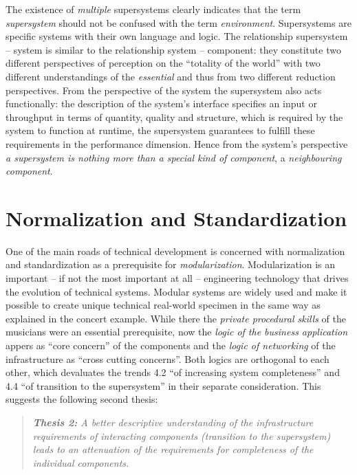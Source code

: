 \documentclass{llncs}
\begin{document}
The existence of \emph{multiple} supersystems clearly indicates that the term
\emph{supersystem} should not be confused with the term \emph{environment}.
Supersystems are specific systems with their own language and logic. The
relationship supersystem -- system is similar to the relationship system --
component: they constitute two different perspectives of perception on the
``totality of the world'' with two different understandings of the
\emph{essential} and thus from two different reduction perspectives.  From the
perspective of the system the supersystem also acts functionally: the
description of the system's interface specifies an input or throughput in
terms of quantity, quality and structure, which is required by the system to
function at runtime, the supersystem guarantees to fulfill these requirements
in the performance dimension.  Hence from the system's perspective \emph{a
  supersystem is nothing more than a special kind of component}, a
\emph{neighbouring component}.

\section{Normalization and Standardization}

One of the main roads of technical development is concerned with normalization
and standardization as a prerequisite for \emph{modularization}.
Modularization is an important -- if not the most important at all --
engineering technology that drives the evolution of technical systems.
Modular systems are widely used and make it possible to create unique
technical real-world specimen in the same way as explained in the concert
example. While there the \emph{private procedural skills} of the musicians
were an essential prerequisite, now the \emph{logic of the business
  application} appers as ``core concern'' of the components and the
\emph{logic of networking} of the infrastructure as ``cross cutting
concerns''. Both logics are orthogonal to each other, which devaluates the
trends 4.2 ``of increasing system completeness'' and 4.4 ``of transition to
the supersystem'' in their separate consideration.  This suggests the
following second thesis:
\begin{quote}\it 
  \textbf{Thesis 2:} A better descriptive understanding of the infrastructure
  requirements of interacting components (transition to the supersystem) leads
  to an \emph{attenuation} of the requirements for completeness of the
  individual components.
\end{quote}
\end{document}

